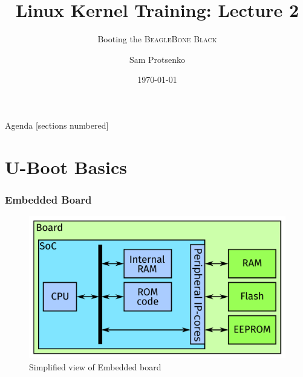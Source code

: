 \documentclass[aspectratio=169]{beamer}
\title{Linux Kernel Training: Lecture 2}
\subtitle{Booting the \textsc{BeagleBone Black}}
\date{\today}
\author{Sam Protsenko}
\institute{GlobalLogic}
\begin{document}
\maketitle

\begin{frame}{Agenda}
  [sections numbered]
  \tableofcontents[hideallsubsections]
\end{frame}

\section{U-Boot Basics}

\begin{frame}
  \frametitle{Embedded Board}
  \begin{figure}
    \centering
    \includegraphics[scale=0.33]{images/board.pdf}
    \caption{Simplified view of Embedded board}
  \end{figure}
\end{frame}
\end{document}
